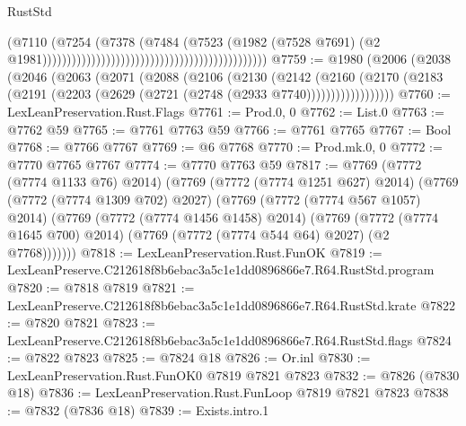\begin{lexlean}{RustStd}
\begin{coremodule}
                                                                                  (@7110
                                                                                    (@7254
                                                                                      (@7378
                                                                                        (@7484
                                                                                          (@7523
                                                                                            (@1982
                                                                                              (@7528
                                                                                                @7691)
                                                                                              (@2
                                                                                                @1981))))))))))))))))))))))))))))))))))))))))))))))
@7759 := @1980
    (@2006
      (@2038
        (@2046
          (@2063
            (@2071
              (@2088
                (@2106
                  (@2130
                    (@2142
                      (@2160
                        (@2170
                          (@2183 (@2191 (@2203 (@2629 (@2721 (@2748 (@2933 @7740))))))))))))))))))
@7760 := LexLeanPreservation.Rust.Flags
@7761 := Prod.{0, 0}
@7762 := List.{0}
@7763 := @7762 @59
@7765 := @7761 @7763 @59
@7766 := @7761 @7765
@7767 := Bool
@7768 := @7766 @7767
@7769 := @6 @7768
@7770 := Prod.mk.{0, 0}
@7772 := @7770 @7765 @7767
@7774 := @7770 @7763 @59
@7817 := @7769
    (@7772 (@7774 @1133 @76) @2014)
    (@7769
      (@7772 (@7774 @1251 @627) @2014)
      (@7769
        (@7772 (@7774 @1309 @702) @2027)
        (@7769
          (@7772 (@7774 @567 @1057) @2014)
          (@7769
            (@7772 (@7774 @1456 @1458) @2014)
            (@7769
              (@7772 (@7774 @1645 @700) @2014)
              (@7769 (@7772 (@7774 @544 @64) @2027) (@2 @7768)))))))
@7818 := LexLeanPreservation.Rust.FunOK
@7819 := LexLeanPreserve.C212618f8b6ebac3a5c1e1dd0896866e7.R64.RustStd.program
@7820 := @7818 @7819
@7821 := LexLeanPreserve.C212618f8b6ebac3a5c1e1dd0896866e7.R64.RustStd.krate
@7822 := @7820 @7821
@7823 := LexLeanPreserve.C212618f8b6ebac3a5c1e1dd0896866e7.R64.RustStd.flags
@7824 := @7822 @7823
@7825 := @7824 @18
@7826 := Or.inl
@7830 := LexLeanPreservation.Rust.FunOK0 @7819 @7821 @7823
@7832 := @7826 (@7830 @18)
@7836 := LexLeanPreservation.Rust.FunLoop @7819 @7821 @7823
@7838 := @7832 (@7836 @18)
@7839 := Exists.intro.{1}

\end{coremodule}
\end{lexlean}
